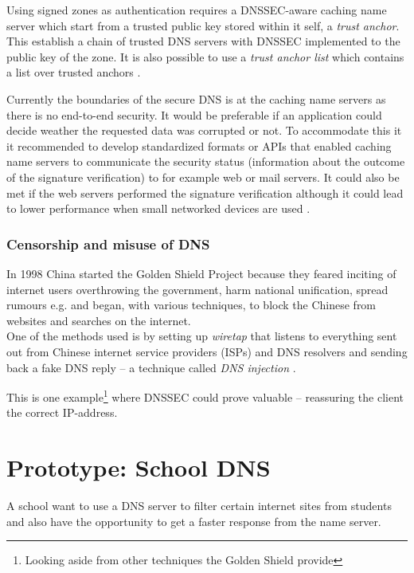 \documentclass[a4paper,10pt]{report}
\begin{document}
Using signed zones as authentication requires a DNSSEC-aware caching name server which start from a trusted public key stored within it self, a \textit{trust anchor}.
This establish a chain of trusted DNS servers with DNSSEC implemented to the public key of the zone. 
It is also possible to use a \textit{trust anchor list} which contains a list over trusted anchors \cite{DNS-article}.

Currently the boundaries of the secure DNS is at the caching name servers as there is no end-to-end security. It would be preferable if an application could decide weather the requested data was corrupted or not. To accommodate this it it recommended to develop standardized formats or APIs that enabled caching name servers to communicate the security status (information about the outcome of the signature verification) to for example web or mail servers. It could also be met if the web servers performed the signature verification although it could lead to lower performance when small networked devices are used \cite{DNS-article}.



\subsection{Censorship and misuse of DNS}


In 1998 China started the Golden Shield Project because they feared inciting of internet users overthrowing the government, harm national unification, spread rumours e.g.\cite{GFW-avoid} and began, with various techniques, to block the Chinese from websites and searches on the internet.
\\
One of the methods used is by setting up \textit{wiretap} that listens to everything sent out from Chinese internet service providers (ISPs) and DNS resolvers and sending back a fake DNS reply -- a technique called \textit{DNS injection} \cite{GFW}. 


This is one example\footnote{Looking aside from other techniques the Golden Shield provide} where DNSSEC could prove valuable -- reassuring the client the correct IP-address.

\chapter{Prototype: School DNS}
A school want to use a DNS server to filter certain internet sites from students and also have the opportunity to get a faster response from the name server. 
\end{document}
